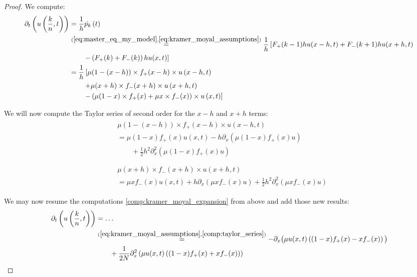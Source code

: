 \documentclass[12pt,a4paper,twoside]{article}
\begin{document}
\begin{proof}
	We compute:
	\begin{align}\label{comp:kramer_moyal_expansion}
	\begin{split}
	\partial_t \left(u\left(\frac{k}{n}, t\right)\right) &= \frac{1}{h}\dot{p_k}\left(t\right)\\
	&\overset{(\ref{eq:master_eq_my_model},\ref{eq:kramer_moyal_assumptions})}{=} \frac{1}{h}\left[F_+(k-1)hu(x-h,t) + F_-(k+1)hu(x+h,t)\right.\\
	&\qquad\left. - \left(F_+(k)+F_-(k)\right)hu(x,t)\right]\\
	&= \frac{1}{h}\left[\mu(1-(x-h))\times f_+(x-h) \times u\left(x-h,t \right)\right.\\
	&\qquad\left. + \mu(x+h)\times f_-(x+h)\times u\left(x+h,t\right)\right.\\
	&\qquad\left.- \left(\mu(1-x)\times f_+(x) + \mu x\times f_-(x)\right)\times u\left(x,t\right)\right] 
	\end{split}
	\end{align}
	
	We will now compute the Taylor series of second order for the $x-h$ and $x+h$ terms:
	\begin{align}\label{comp:taylor_series}
	\begin{split}
	&\mu(1-(x-h))\times f_+(x-h) \times u\left(x-h,t \right)\\
	&= \mu(1-x)f_+(x) u\left(x,t\right) - h\partial_x \left(\mu(1-x)f_+(x)u\right)\\
	&\qquad +\frac{1}{2}h^2\partial^2_x\left(\mu(1-x)f_+(x)u\right)\\
	&\\
	&\\
	&\mu(x+h)\times f_-(x+h) \times u\left(x+h,t\right)\\
	&= \mu x f_-(x)u(x,t) + h\partial_x \left(\mu x f_-(x) u\right) + \frac{1}{2}h^2\partial^2_x\left(\mu xf_-(x) u\right)
	\end{split}
	\end{align}
	
	We may now resume the computations \eqref{comp:kramer_moyal_expansion} from above and add those new results:
	\begin{align*}
	\partial_t \left(u\left(\frac{k}{n}, t\right)\right) &= \dots \\
	&\overset{(\ref{eq:kramer_moyal_assumptions}, \ref{comp:taylor_series})}{=} -\partial_x\big(\mu u(x,t)\left((1-x)f_+(x) - xf_-(x)\right)\big)\\
	&\qquad + \frac{1}{2N} \partial^2_x\left(\mu u(x,t)\left((1-x)f_+(x) + xf_-(x)\right)\right)\\
	\end{align*}
	

\end{proof}
\end{document}
